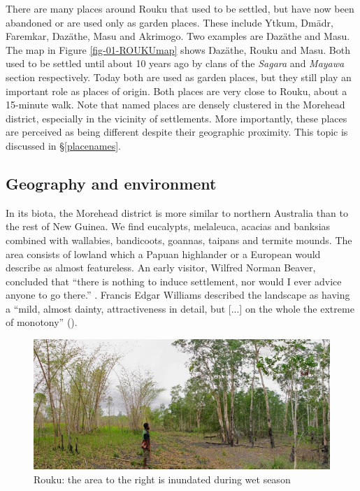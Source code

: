 There are many places around Rouku that used to be settled, but have now been abandoned or are used only as garden places. These include Ytkum, Dmädr, Faremkar, Ŋazäthe, Masu and Akrimogo. Two examples are Ŋazäthe and Masu. The map in Figure \ref{fig-01-ROUKUmap} shows Ŋazäthe, Rouku and Masu. Both used to be settled until about 10 years ago by clans of the \emph{Sagara} and \emph{Mayawa} section respectively. Today both are used as garden places, but they still play an important role as places of origin. Both places are very close to Rouku, about a 15-minute walk. Note that named places are densely clustered in the Morehead district, especially in the vicinity of settlements. More importantly, these places are perceived as being different despite their geographic proximity. This topic is discussed in \S\ref{placenames}.

\subsection{Geography and environment}\label{geographyenviro}

In its biota, the Morehead district is more similar to northern Australia than to the rest of New Guinea. We find eucalypts, melaleuca, acacias and banksias combined with wallabies, bandicoots, goannas, taipans and termite mounds. The area consists of lowland which a Papuan highlander or a European would describe as almost featureless. An early visitor, Wilfred Norman Beaver, concluded that ``there is nothing to induce settlement, nor would I ever advice anyone to go there.'' \citep[64]{Murray1912pap}. Francis Edgar Williams described the landscape as having a ``mild, almost dainty, attractiveness in detail, but [...] on the whole the extreme of monotony'' (\citeyear[1]{Williams:1936transfly}).

\begin{figure}
    \includegraphics[width=.9\textwidth]{figures/landscape1.jpg}
  \caption[The highest water level during wet season]{Rouku: the area to the right is inundated during wet season}
  \label{fig:landscape1}
\end{figure}%

